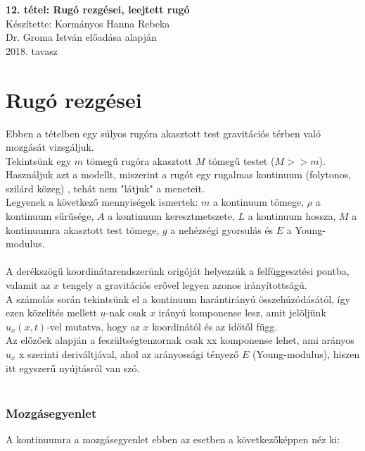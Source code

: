 \documentclass[a4paper]{article}
\begin{document}
\begin{titlepage}
	\begin{center}
		\vspace{1 cm}
		\Huge{\textbf{12. tétel: Rugó rezgései, leejtett rugó\\ }}
		\vspace{5 cm}
		\Large{Készítette: Kormányos Hanna Rebeka\\
				Dr. Groma István előadása alapján\\ 
				2018. tavasz}
	\end{center}
	
\end{titlepage}



\section*{Rugó rezgései}
Ebben a tételben egy súlyos rugóra akasztott test gravitációs térben való mozgását vizsgáljuk. \\
Tekintsünk egy $m$ tömegű rugóra akasztott $M$ tömegű testet ($M>>m$). Használjuk azt a modellt, miszerint a rugót egy rugalmas kontinuum (folytonos, szilárd közeg) , tehát nem "látjuk" a meneteit. \\
Legyenek a következő mennyiségek ismertek: $m$ a kontinuum tömege, $\rho$ a kontinuum sűrűsége, $A$ a kontinuum keresztmetszete, $L$ a kontinuum hossza, $M$ a kontinuumra akasztott test tömege, $g$ a nehézségi gyorsulás és $E$ a Young-modulus.\\ \\
A derékszögű koordinátarendszerünk origóját helyezzük a felfüggesztési pontba, valamit az $x$ tengely a gravitációs erővel legyen azonos irányítottságú. \\ 
A számolás során tekintsünk el a kontinuum harántirányú összehúzódásától, így ezen közelítés mellett $\underline{u}$-nak csak $x$ irányú komponense lesz, amit jelöljünk $u_{x}(x,t)$-vel mutatva, hogy az $x$ koordinától és az időtől függ.\\
Az előzőek alapján a feszültségtenzornak csak {xx} komponense lehet, ami arányos $u_x$ x szerinti deriváltjával, ahol az arányossági tényező $E$ (Young-modulus), hiszen itt egyszerű nyújtásról van szó. \\
$$

\subsubsection*{Mozgásegyenlet}
A kontinuumra a mozgásegyenlet ebben az esetben a következőképpen néz ki:\\
\end{document}
